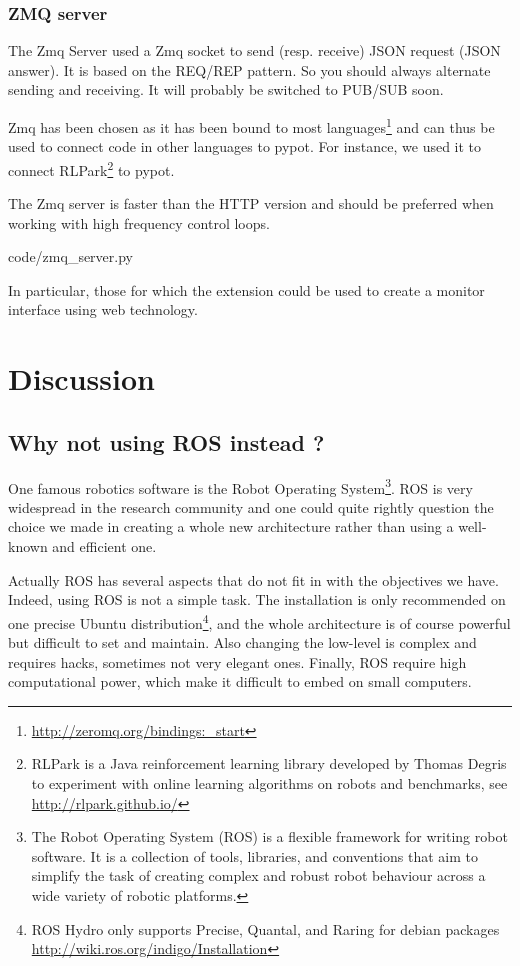 \subsubsection{ZMQ server} %

The Zmq Server used a Zmq socket to send (resp. receive) JSON request (JSON answer). It is based on the REQ/REP pattern. So you should always alternate sending and receiving. It will probably be switched to PUB/SUB soon.

Zmq has been chosen as it has been bound to most languages\footnote{\url{http://zeromq.org/bindings:_start}} and can thus be used to connect code in other languages to pypot. For instance, we used it to connect RLPark\footnote{RLPark is a Java reinforcement learning library developed by Thomas Degris to experiment with online learning algorithms on robots and benchmarks, see \url{http://rlpark.github.io/}} to pypot.

The Zmq server is faster than the HTTP version and should be preferred when working with high frequency control loops.


    {code/zmq_server.py}


In particular, those for which the extension could be used to create a monitor interface using web technology.



\section{Discussion} %

\subsection{Why not using ROS instead ?} %

One famous robotics software is the Robot Operating System\footnote{The Robot Operating System (ROS) is a flexible framework for writing robot software. It is a collection of tools, libraries, and conventions that aim to simplify the task of creating complex and robust robot behaviour across a wide variety of robotic platforms.}. ROS is very widespread in the research community and one could quite rightly question the choice we made in creating a whole new architecture rather than using a well-known and efficient one.

Actually ROS has several aspects that do not fit in with the objectives we have. Indeed, using ROS is not a simple task. The installation is only recommended on one precise Ubuntu distribution\footnote{ROS Hydro only supports Precise, Quantal, and Raring for debian packages \url{http://wiki.ros.org/indigo/Installation}}, and the whole architecture is of course powerful but difficult to set and maintain. Also changing the low-level is complex and requires hacks, sometimes not very elegant ones. Finally, ROS require high computational power, which make it difficult to embed on small computers.

